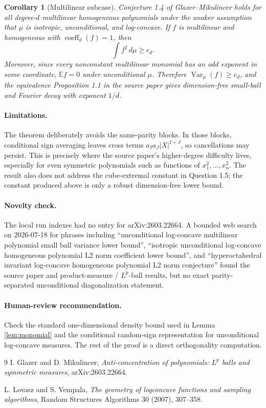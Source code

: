 \documentclass[11pt]{article}
\newtheorem{corollary}{Corollary}
\newcommand{\E}{\mathbb E}
\newcommand{\Var}{\operatorname{Var}}
\begin{document}
\begin{corollary}[Multilinear subcase]
\label{cor:multilinear}
Conjecture 1.4 of Glazer--Mikulincer holds for all degree-$d$ multilinear
homogeneous polynomials under the weaker assumption that $\mu$ is isotropic,
unconditional, and log-concave.  If $f$ is multilinear and homogeneous with
$\operatorname{coeff}_d(f)=1$, then
\[
  \int f^2\,d\mu\geq c_d .
\]
Moreover, since every nonconstant multilinear monomial has an odd exponent in
some coordinate, $\E f=0$ under unconditional $\mu$.  Therefore
$\Var_\mu(f)\geq c_d$, and the equivalence Proposition 1.1 in the source paper
gives dimension-free small-ball and Fourier decay with exponent $1/d$.
\end{corollary}

\paragraph{Limitations.}
The theorem deliberately avoids the same-parity blocks.  In those blocks,
conditional sign averaging leaves cross terms
$a_Ia_J |X|^{I+J}$, so cancellations may persist.  This is precisely where the
source paper's higher-degree difficulty lives, especially for even symmetric
polynomials such as functions of $x_1^2,\ldots,x_n^2$.  The result also does
not address the cube-extremal constant in Question 1.5; the constant produced
above is only a robust dimension-free lower bound.

\paragraph{Novelty check.}
The local run indexes had no entry for arXiv:2603.22664.  A bounded web search
on 2026-07-18 for phrases including ``unconditional log-concave multilinear
polynomial small ball variance lower bound'', ``isotropic unconditional
log-concave homogeneous polynomial L2 norm coefficient lower bound'', and
``hyperoctahedral invariant log-concave homogeneous polynomial L2 norm
conjecture'' found the source paper and product-measure / $L^p$-ball results,
but no exact parity-separated unconditional diagonalization statement.

\paragraph{Human-review recommendation.}
Check the standard one-dimensional density bound used in Lemma
\ref{lem:monomial} and the conditional random-sign representation for
unconditional log-concave measures.  The rest of the proof is a direct
orthogonality computation.

\begin{thebibliography}{9}
I. Glazer and D. Mikulincer, \emph{Anti-concentration of polynomials:
$L^p$ balls and symmetric measures}, arXiv:2603.22664.

L. Lovasz and S. Vempala, \emph{The geometry of logconcave functions and
sampling algorithms}, Random Structures Algorithms 30 (2007), 307--358.
\end{thebibliography}
\end{document}

